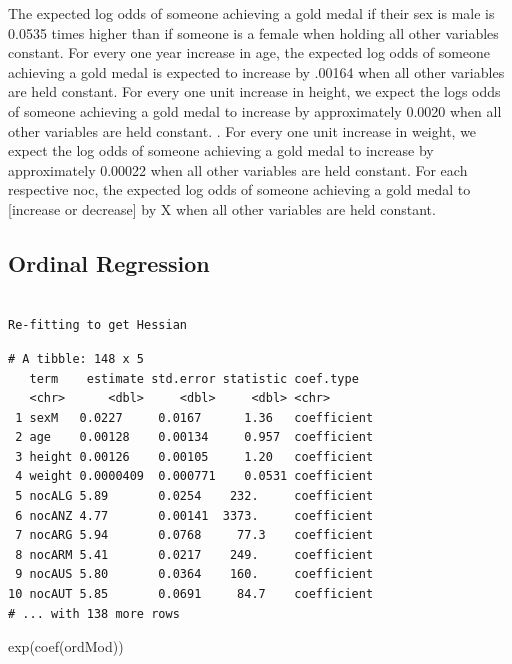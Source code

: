 \documentclass[
  letterpaper,
  DIV=11,
  numbers=noendperiod]{scrartcl}
\newenvironment{Shaded}{\begin{snugshade}}{\end{snugshade}}
\newcommand{\FunctionTok}[1]{\textcolor[rgb]{0.28,0.35,0.67}{#1}}
\newcommand{\NormalTok}[1]{\textcolor[rgb]{0.00,0.23,0.31}{#1}}
\begin{document}
The expected log odds of someone achieving a gold medal if their sex is
male is 0.0535 times higher than if someone is a female when holding all
other variables constant. For every one year increase in age, the
expected log odds of someone achieving a gold medal is expected to
increase by .00164 when all other variables are held constant. For every
one unit increase in height, we expect the logs odds of someone
achieving a gold medal to increase by approximately 0.0020 when all
other variables are held constant. . For every one unit increase in
weight, we expect the log odds of someone achieving a gold medal to
increase by approximately 0.00022 when all other variables are held
constant. For each respective noc, the expected log odds of someone
achieving a gold medal to {[}increase or decrease{]} by X when all other
variables are held constant.

\hypertarget{ordinal-regression}{%
\subsection{Ordinal Regression}\label{ordinal-regression}}

\begin{verbatim}

Re-fitting to get Hessian
\end{verbatim}

\begin{verbatim}
# A tibble: 148 x 5
   term    estimate std.error statistic coef.type  
   <chr>      <dbl>     <dbl>     <dbl> <chr>      
 1 sexM   0.0227     0.0167      1.36   coefficient
 2 age    0.00128    0.00134     0.957  coefficient
 3 height 0.00126    0.00105     1.20   coefficient
 4 weight 0.0000409  0.000771    0.0531 coefficient
 5 nocALG 5.89       0.0254    232.     coefficient
 6 nocANZ 4.77       0.00141  3373.     coefficient
 7 nocARG 5.94       0.0768     77.3    coefficient
 8 nocARM 5.41       0.0217    249.     coefficient
 9 nocAUS 5.80       0.0364    160.     coefficient
10 nocAUT 5.85       0.0691     84.7    coefficient
# ... with 138 more rows
\end{verbatim}

\begin{Shaded}
\begin{Highlighting}[]
\FunctionTok{exp}\NormalTok{(}\FunctionTok{coef}\NormalTok{(ordMod))}
\end{Highlighting}
\end{Shaded}

\hypertarget{section}{%
\subsection{}\label{section}}
\end{document}
